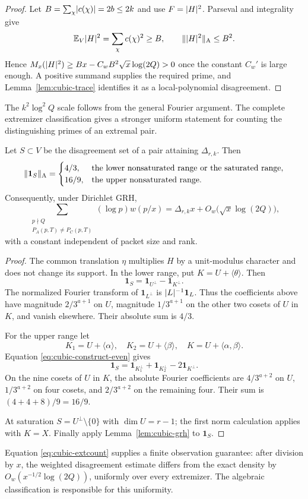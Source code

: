 \begin{proof}
Let $B=\sum_\chi\lvert c(\chi)\rvert=2b\leq2k$ and use $F=\lvert H\rvert^2$.
Parseval and integrality give
\[
 \mathbb E_V\lvert H\rvert^2=\sum_\chi c(\chi)^2\geq B,\qquad
 \lVert\lvert H\rvert^2\rVert_{\mathrm A}\leq B^2.
\]
Hence $M_x(\lvert H\rvert^2)\geq Bx-C_wB^2\sqrt{x}\log(2Q)>0$ once the
constant $C_w'$ is large enough. A positive summand supplies the
required prime, and Lemma~\ref{lem:cubic-trace} identifies it as a
local-polynomial disagreement.
\end{proof}

The $k^2\log^2 Q$ scale follows from the general Fourier argument. The
complete extremizer classification gives a stronger uniform statement
for counting the distinguishing primes of an extremal pair.

\begin{theorem}
\label{thm:cubic-norm}
Let $S\subset V$ be the disagreement set of a pair attaining
$\Delta_{r,k}$. Then
\begin{equation}\label{eq:cubic-exactnorm}
 \lVert\mathbf1_S\rVert_{\mathrm A}=
 \begin{cases}
  4/3,&\text{the lower nonsaturated range or the saturated range},\\
  16/9,&\text{the upper nonsaturated range}.
 \end{cases}
\end{equation}
Consequently, under Dirichlet GRH,
\begin{equation}\label{eq:cubic-extcount}
 \sum_{\substack{p\nmid Q\\P_A(p,T)\ne P_C(p,T)}}
    (\log p)w(p/x)
 =\Delta_{r,k}x+O_w\bigl(\sqrt{x}\log(2Q)\bigr),
\end{equation}
with a constant independent of packet size and rank.
\end{theorem}

\begin{proof}
The common translation $\eta$ multiplies $H$ by a unit-modulus character
and does not change its support. In the lower range, put
$K=U+\langle\theta\rangle$. Then
\[
 \mathbf1_S=\mathbf1_{U^\perp}-\mathbf1_{K^\perp}.
\]
The normalized Fourier transform of $\mathbf1_{L^\perp}$ is
$\lvert L\rvert^{-1}\mathbf1_L$. Thus the coefficients above have magnitude
$2/3^{a+1}$ on $U$, magnitude $1/3^{a+1}$ on the other two cosets of
$U$ in $K$, and vanish elsewhere. Their absolute sum is $4/3$.

For the upper range let
\[
 K_1=U+\langle\alpha\rangle,\quad
 K_2=U+\langle\beta\rangle,\quad
 K=U+\langle\alpha,\beta\rangle.
\]
Equation \eqref{eq:cubic-construct-even} gives
\[
 \mathbf1_S=\mathbf1_{K_1^\perp}+\mathbf1_{K_2^\perp}
             -2\mathbf1_{K^\perp}.
\]
On the nine cosets of $U$ in $K$, the absolute Fourier coefficients
are $4/3^{a+2}$ on $U$, $1/3^{a+2}$ on four cosets, and
$2/3^{a+2}$ on the remaining four. Their sum is
$(4+4+8)/9=16/9$.

At saturation $S=U^\perp\setminus\{0\}$ with $\dim U=r-1$;
the first norm calculation applies with $K=X$. Finally apply
Lemma~\ref{lem:cubic-grh} to $\mathbf1_S$.
\end{proof}

Equation \eqref{eq:cubic-extcount} supplies a finite observation guarantee:
after division by $x$, the weighted disagreement estimate differs from
the exact density by $O_w(x^{-1/2}\log(2Q))$, uniformly over every
extremizer. The algebraic classification is responsible for this
uniformity.

